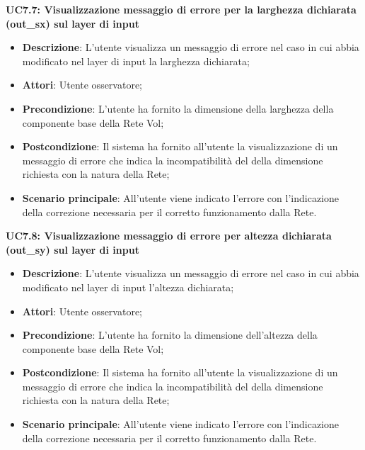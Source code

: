 \textbf{UC7.7: Visualizzazione messaggio di errore per la larghezza dichiarata (out\_sx) sul layer di input}\mbox{}
\label{UC7.7: Visualizzazione messaggio di errore per la larghezza dichiarata sul layer di input}
\noindent
\begin{itemize}
\item \textbf{Descrizione}: L'utente visualizza un messaggio di errore nel caso in cui abbia modificato nel layer di input la larghezza dichiarata;
\item \textbf{Attori}: Utente osservatore;
\item \textbf{Precondizione}: L'utente ha fornito la dimensione della larghezza della componente base della Rete Vol;
\item \textbf{Postcondizione}: Il sistema ha fornito all'utente la visualizzazione di un messaggio di errore che indica la incompatibilit\`a del della dimensione richiesta con la natura della Rete;
\item \textbf{Scenario principale}: All'utente viene indicato l'errore con l'indicazione della correzione necessaria per il corretto funzionamento dalla Rete.
\end{itemize}

\textbf{UC7.8: Visualizzazione messaggio di errore per altezza dichiarata (out\_sy) sul layer di input}\mbox{}
\label{UC7.8: Visualizzazione messaggio di errore per altezza dichiarata sul layer di input}
\noindent
\begin{itemize}
\item \textbf{Descrizione}: L'utente visualizza un messaggio di errore nel caso in cui abbia modificato nel layer di input l'altezza dichiarata;
\item \textbf{Attori}: Utente osservatore;
\item \textbf{Precondizione}: L'utente ha fornito la dimensione dell'altezza della componente base della Rete Vol;
\item \textbf{Postcondizione}: Il sistema ha fornito all'utente la visualizzazione di un messaggio di errore che indica la incompatibilit\`a del della dimensione richiesta con la natura della Rete;
\item \textbf{Scenario principale}: All'utente viene indicato l'errore con l'indicazione della correzione necessaria per il corretto funzionamento dalla Rete.
\end{itemize}


